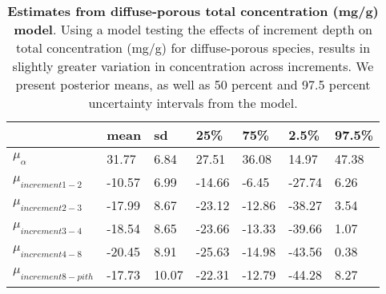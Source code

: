 \documentclass{article}\usepackage[]{graphicx}\usepackage[]{color}
\begin{document}
\begin{table}[ht]
\centering
\caption{\textbf{Estimates from diffuse-porous total concentration (mg/g) model}. Using a model testing the effects of increment depth on total concentration (mg/g) for diffuse-porous species, results in slightly greater variation in concentration across increments. We present posterior means, as well as 50 percent and 97.5 percent uncertainty intervals from the model.} 
\label{tab:difftot}
\begingroup\footnotesize
\begin{tabular}{|p{}|p{}|p{}|p{}|p{}|p{}|p{}|}
  \hline
 & mean & sd & 25\% & 75\% & 2.5\% & 97.5\% \\ 
  \hline
$\mu_{\alpha}$ & 31.77 & 6.84 & 27.51 & 36.08 & 14.97 & 47.38 \\ 
  $\mu_{increment 1-2}$ & -10.57 & 6.99 & -14.66 & -6.45 & -27.74 & 6.26 \\ 
  $\mu_{increment 2-3}$ & -17.99 & 8.67 & -23.12 & -12.86 & -38.27 & 3.54 \\ 
  $\mu_{increment 3-4}$ & -18.54 & 8.65 & -23.66 & -13.33 & -39.66 & 1.07 \\ 
  $\mu_{increment 4-8}$ & -20.45 & 8.91 & -25.63 & -14.98 & -43.56 & 0.38 \\ 
  $\mu_{increment 8-pith}$ & -17.73 & 10.07 & -22.31 & -12.79 & -44.28 & 8.27 \\ 
   \hline
\end{tabular}
\endgroup
\end{table}
\end{document}
